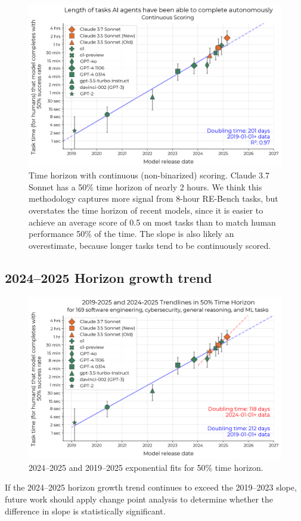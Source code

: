 \documentclass{article}
\begin{document}
\begin{figure}
    \centering
    \includegraphics[width=0.7\linewidth]{plots/logistic/partial_scoring.png}
    \caption{Time horizon with continuous (non-binarized) scoring. Claude 3.7 Sonnet has a 50\% time horizon of nearly 2 hours. We think this methodology captures more signal from 8-hour RE-Bench tasks, but overstates the time horizon of recent models, since it is easier to achieve an average score of 0.5 on most tasks than to match human performance 50\% of the time. The slope is also likely an overestimate, because longer tasks tend to be continuously scored.}
    \label{fig:continuous-scoring}
\end{figure}


\subsection{2024--2025 Horizon growth trend} \label{app:2024-trend}

\begin{figure}
    \centering
    \includegraphics[width=0.7\linewidth]{plots/logistic/double_line_2024_trendline.png}
    \caption{2024--2025 and 2019--2025 exponential fits for 50\% time horizon.}
    \label{fig:2024-trend}
\end{figure}

If the 2024--2025 horizon growth trend continues to exceed the 2019--2023 slope, future work should apply change point analysis to determine whether the difference in slope is statistically significant.
\end{document}
